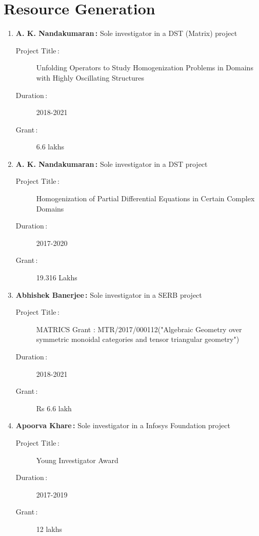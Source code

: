 




\section{Resource Generation}

\begin{enumerate}

\item {\bf A. K. Nandakumaran\,:} Sole investigator in a DST (Matrix) project
\begin{description}
  \item[Project Title\,:] Unfolding Operators to Study Homogenization Problems in Domains with Highly Oscillating Structures
  \item[Duration\,:] 2018-2021
  \item[Grant\,:] 6.6 lakhs
\end{description}


\item {\bf A. K. Nandakumaran\,:} Sole investigator in a DST project
\begin{description}
  \item[Project Title\,:] Homogenization of Partial Differential Equations in Certain Complex Domains
  \item[Duration\,:] 2017-2020
  \item[Grant\,:] 19.316 Lakhs
\end{description}


\item {\bf Abhishek Banerjee\,:} Sole investigator in a SERB project
\begin{description}
  \item[Project Title\,:] MATRICS Grant : MTR/2017/000112("Algebraic Geometry over symmetric monoidal categories and tensor triangular geometry")
  \item[Duration\,:] 2018-2021
  \item[Grant\,:] Rs 6.6 lakh
\end{description}


\item {\bf Apoorva Khare\,:} Sole investigator in a Infosys Foundation project
\begin{description}
  \item[Project Title\,:] Young Investigator Award
  \item[Duration\,:] 2017-2019
  \item[Grant\,:] 12 lakhs
\end{description}



\end{enumerate}
